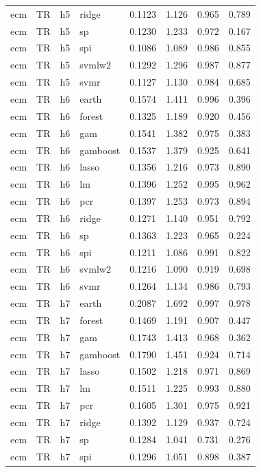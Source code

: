 \begin{ThreePartTable}
\begin{longtable}[t]{llclcccc}
ecm & TR & h5 & ridge & 0.1123 & 1.126 & 0.965 & 0.789\\
ecm & TR & h5 & sp & 0.1230 & 1.233 & 0.972 & 0.167\\
ecm & TR & h5 & spi & 0.1086 & 1.089 & 0.986 & 0.855\\
ecm & TR & h5 & svmlw2 & 0.1292 & 1.296 & 0.987 & 0.877\\
ecm & TR & h5 & svmr & 0.1127 & 1.130 & 0.984 & 0.685\\
\addlinespace
ecm & TR & h6 & earth & 0.1574 & 1.411 & 0.996 & 0.396\\
ecm & TR & h6 & forest & 0.1325 & 1.189 & 0.920 & 0.456\\
ecm & TR & h6 & gam & 0.1541 & 1.382 & 0.975 & 0.383\\
ecm & TR & h6 & gamboost & 0.1537 & 1.379 & 0.925 & 0.641\\
ecm & TR & h6 & lasso & 0.1356 & 1.216 & 0.973 & 0.890\\
ecm & TR & h6 & lm & 0.1396 & 1.252 & 0.995 & 0.962\\
ecm & TR & h6 & pcr & 0.1397 & 1.253 & 0.973 & 0.894\\
ecm & TR & h6 & ridge & 0.1271 & 1.140 & 0.951 & 0.792\\
ecm & TR & h6 & sp & 0.1363 & 1.223 & 0.965 & 0.224\\
ecm & TR & h6 & spi & 0.1211 & 1.086 & 0.991 & 0.822\\
ecm & TR & h6 & svmlw2 & 0.1216 & 1.090 & 0.919 & 0.698\\
ecm & TR & h6 & svmr & 0.1264 & 1.134 & 0.986 & 0.793\\
\addlinespace
ecm & TR & h7 & earth & 0.2087 & 1.692 & 0.997 & 0.978\\
ecm & TR & h7 & forest & 0.1469 & 1.191 & 0.907 & 0.447\\
ecm & TR & h7 & gam & 0.1743 & 1.413 & 0.968 & 0.362\\
ecm & TR & h7 & gamboost & 0.1790 & 1.451 & 0.924 & 0.714\\
ecm & TR & h7 & lasso & 0.1502 & 1.218 & 0.971 & 0.869\\
ecm & TR & h7 & lm & 0.1511 & 1.225 & 0.993 & 0.880\\
ecm & TR & h7 & pcr & 0.1605 & 1.301 & 0.975 & 0.921\\
ecm & TR & h7 & ridge & 0.1392 & 1.129 & 0.937 & 0.724\\
ecm & TR & h7 & sp & 0.1284 & 1.041 & 0.731 & 0.276\\
ecm & TR & h7 & spi & 0.1296 & 1.051 & 0.898 & 0.387\\

\end{longtable}
\end{ThreePartTable}
